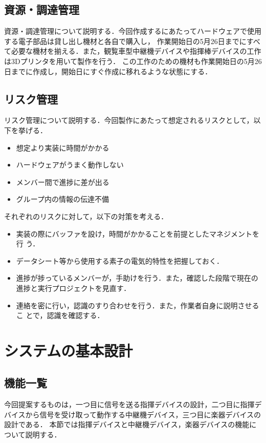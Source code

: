 \documentclass[lualatex,book,paper=a4paper,jafontsize=11.5pt,jafontscale=1.05]{jlreq}
\begin{document}
\section{資源・調達管理}
資源・調達管理について説明する．今回作成するにあたってハードウェアで使用する電子部品は貸し出し機材と各自で購入し，
作業開始日の5月26日までにすべて必要な機材を揃える．また，観覧車型中継機デバイスや指揮棒デバイスの工作は3Dプリンタを用いて製作を行う．
この工作のための機材も作業開始日の5月26日までに作成し，開始日にすぐ作成に移れるような状態にする．

\section{リスク管理}
リスク管理について説明する．今回製作にあたって想定されるリスクとして，以下を挙げる．
\begin{itemize}
\item 想定より実装に時間がかかる
\item ハードウェアがうまく動作しない
\item  メンバー間で進捗に差が出る
\item グループ内の情報の伝達不備
\end{itemize}
それぞれのリスクに対して，以下の対策を考える．
\begin{itemize}
\item 実装の際にバッファを設け，時間がかかることを前提としたマネジメントを行
う．
\item データシート等から使用する素子の電気的特性を把握しておく．
\item 進捗が捗っているメンバーが，手助けを行う．また，確認した段階で現在の
進捗と実行プロジェクトを見直す．
\item 連絡を密に行い，認識のすり合わせを行う．また，作業者自身に説明させるこ
とで，認識を確認する．
\end{itemize}





\chapter{システムの基本設計}
\section{機能一覧}
今回提案するものは，一つ目に信号を送る指揮デバイスの設計，二つ目に指揮デバイスから信号を受け取って動作する中継機デバイス，三つ目に楽器デバイスの設計である．
本節では指揮デバイスと中継機デバイス，楽器デバイスの機能について説明する．
\end{document}
